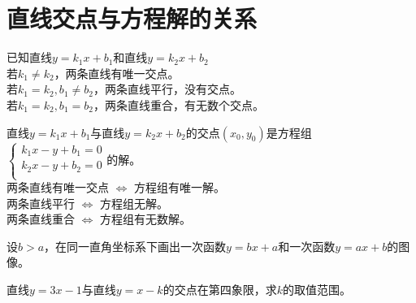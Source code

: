 \documentclass{ecnuthesis}
\begin{document}
\section{直线交点与方程解的关系}
\begin{knowledge}
    已知直线$y=k_1x+b_1$和直线$y=k_2x+b_2$ \\
    若$k_1\ne k_2$，两条直线有唯一交点。 \\
    若$k_1 = k_2, b_1 \ne b_2$，两条直线平行，没有交点。 \\
    若$k_1 = k_2, b_1 = b_2$，两条直线重合，有无数个交点。
\end{knowledge}
\begin{knowledge}
    直线$y=k_1x+b_1$与直线$y=k_2x+b_2$的交点$(x_0,y_0)$是方程组 \\
    $\begin{cases} k_1x-y+b_1=0  \\ k_2x-y+b_2=0  \\ \end{cases}$的解。\\
    两条直线有唯一交点 $\Leftrightarrow$ 方程组有唯一解。 \\
    两条直线平行 $\Leftrightarrow$ 方程组无解。 \\
    两条直线重合 $\Leftrightarrow$ 方程组有无数解。
\end{knowledge}
\begin{problem}
    设$b>a$，在同一直角坐标系下画出一次函数$y=bx+a$和一次函数$y=ax+b$的图像。\\
\end{problem}
\begin{problem}
    直线$y=3x-1$与直线$y=x-k$的交点在第四象限，求$k$的取值范围。\\
\end{problem}
\clearpage
\end{document}
